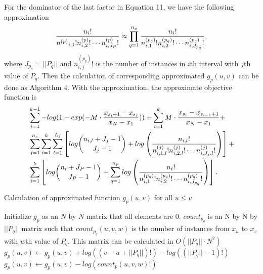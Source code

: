 For the dominator of the last factor in Equation 11, we have the following approximation
\begin{equation}
{{{{n}_i}!}\over{ {{n^{(p)}}_{i,1} !} {n^{(p)}_{i,2} !} \cdots {n^{(p)}_{i,J_P} !}}} \approx \prod_{q=1}^{n_p} { {{{n}_i}!}\over{ {n^{(p_q)}_{i,1} !} {n^{(p_q)}_{i,2} !} \cdots {n^{(p_q)}_{i,J_{p_q}} !}}},
\end{equation}
where $J_{p_q} = || P_q||$ and ${n^{(p_q)}_{i,j} !}$ is the number of instances in $i$th interval with $j$th value of $P_q$. Then the calculation of corresponding approximated $g_p(u,v)$ can be done as Algorithm 4. With the approximation, the approximate objective function is
\begin{equation}
\begin{aligned}
& \sum_{i=1}^{k-1} - log(1 - {exp(- M \cdot {{x_{s_i+1} - x_{s_i}}\over{x_N - x_1}})}) +  \sum_{i=1}^{k} M \cdot {{x_{s_{i}} - x_{s_{i-1} + 1}}\over{x_N - x_1}} +\\
&  \sum_{j=1}^{n_c} \sum_{i=1}^{k}  \sum_{l=1}^{L_j} \left[  log{{n_{i,l} + J_j - 1}\choose{J_j-1}} + log \left( { {{n_{i,l}}!}\over{ {n^{(j)}_{i,1,l} !} {n^{(j)}_{i,2,l} !} \cdots {n^{(j)}_{i,J_j,l} !}} } \right) \right] + \\
& \sum_{i=1}^k \left[  log {{n_{i} + J_P - 1}\choose{J_P-1}} + \sum_{q=1}^{n_p} log \left( { {{{n}_i}!}\over{ {n^{(p_q)}_{i,1} !} {n^{(p_q)}_{i,2} !} \cdots {n^{(p_q)}_{i,J_{p_q}} !}}} \right) \right].
\end{aligned}
\end{equation}

\begin{algorithm}
\caption{ Calculation of approximated function $g_p(u,v)$ for all $u \leq v$}\label{euclid}
\begin{algorithmic}[1]
\State Initialize $g_p$ as an $N$ by $N$ matrix that all elements are 0.
\State $count_{p_q}$ is an N by N by $||P_q||$ matrix such that $count_{p_q} (u,v,w)$ is the number of instances from $x_u$ to $x_v$ with $w$th value of $P_q$. This matrix can be calculated in $O(||P_q|| \cdot N^2)$
\State $g_p(u,v) \leftarrow g_p(u,v) + log((v-u + ||P_q||)!) - log((||P_q|| -1)!)$
\State $g_p(u,v) \leftarrow g_p(u,v) - log( count_p(u,v,w)!)$
\EndFor 
\EndFor
\EndFor
\EndFor
\end{algorithmic}
\end{algorithm}

